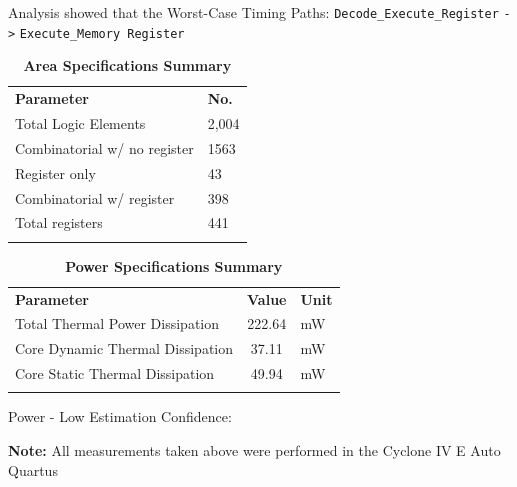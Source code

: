 \documentclass[10pt]{datasheet}
\begin{document}
Analysis showed that the Worst-Case Timing Paths: \verb|Decode_Execute_Register| \verb|->| \verb|Execute_Memory Register|

\begin{table}[h]
\caption{\textbf{Area Specifications Summary } }
\begin{tabularx}{\textwidth}{l | X}
    \thickhline
    \textbf{Parameter} &  \textbf{No.} \\
    \thickhline
    Total Logic Elements &  2,004\\
    \hline
    Combinatorial w/ no register  & 1563  \\
     \hline
    Register only & 43  \\
    \hline
    Combinatorial w/ register & 398 \\
    \hline
    Total registers & 441 \\
    \thickhline
\end{tabularx}
\end{table}

\begin{table}[h]
\caption{\textbf{Power Specifications Summary } }
\begin{tabularx}{\textwidth}{l | c | X}
    \thickhline
    \textbf{Parameter} & \textbf{Value} &  \textbf{Unit} \\
    \thickhline
    Total Thermal Power Dissipation & 222.64 & mW\\
    \hline
     Core Dynamic Thermal Dissipation  & 37.11 & mW  \\
     \hline
    Core Static Thermal Dissipation & 49.94 & mW  \\
    \thickhline
\end{tabularx}
\end{table}
Power - Low Estimation Confidence:

\textbf{Note:} All measurements taken above were performed in the Cyclone IV E Auto Quartus
\end{document}
